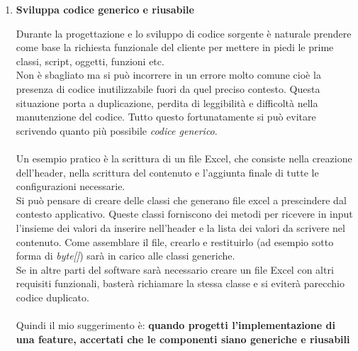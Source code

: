 \begin{enumerate}
In ogni caso il mio suggerimento è: \textbf{niente panico}. La prima cosa che lo sviluppatore medio pensa è: <<ora gli mollo un \emph{taccone} e in mezz'ora sono pronto per il deploy in produzione>>. Niente di più sbagliato. Agendo secondo questo principio del \emph{tutto e subito} stiamo solamente portando avanti la \textbf{teoria dei vetri rotti}. \\
La teoria dei vetri rotti sostiene, parafrasando, che un palazzo con una finestra rotta, potrebbe generare fenomeni di emulazione, portando qualcun altro a rompere un lampione o un idrante, dando così inizio a una spirale di degrado urbano e sociale. Ora il nostro palazzo è il codice sorgente e i passanti siamo noi programmatori. Il nostro compito è mantenere il palazzo in ottime condizioni e soprattutto evitare che qualcuno rompa le componenti. \\ \\
<<Si, bravo, belle parole, ma io ora come faccio? Devo consegnare fra mezz'ora>>. Nessun problema, l'allenamento è la miglior pratica: più ti allenerai a trovare la soluzione migliore e progettarla con altrettanta cura, più velocizzerai il modo di refattorizzare codice nel più breve tempo possibile. \'E una skill da non sottovalutare\dots e fa anche curriculum.

\item \textbf{Sviluppa codice generico e riusabile}

Durante la progettazione e lo sviluppo di codice sorgente è naturale prendere come base la richiesta funzionale del cliente per mettere in piedi le prime classi, script, oggetti, funzioni etc.\\ Non è sbagliato ma si può incorrere in un errore molto comune cioè la presenza di codice inutilizzabile fuori da quel preciso contesto. Questa situazione porta a duplicazione, perdita di leggibilità e difficoltà nella manutenzione del codice. Tutto questo fortunatamente si può evitare scrivendo quanto più possibile \emph{codice generico}. \\ \\
Un esempio pratico è la scrittura di un file Excel, che consiste nella creazione dell'header, nella scrittura del contenuto e l'aggiunta finale di tutte le configurazioni necessarie.\\
Si può pensare di creare delle classi che generano file excel a prescindere dal contesto applicativo. Queste classi forniscono dei metodi per ricevere in input l'insieme dei valori da inserire nell'header e la lista dei valori da scrivere nel contenuto. Come assemblare il file, crearlo e restituirlo (ad esempio sotto forma di \emph{byte[]}) sarà in carico alle classi generiche. \\Se in altre parti del software sarà necessario creare un file Excel con altri requisiti funzionali, basterà richiamare la stessa classe e si eviterà parecchio codice duplicato. \\ \\
Quindi il mio suggerimento è: \textbf{quando progetti l'implementazione di una feature, accertati che le componenti siano generiche e riusabili}


\end{enumerate}
